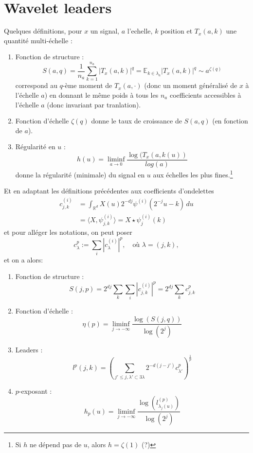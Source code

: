 \documentclass[11pt]{article} %
\begin{document}
\section{Wavelet leaders}
	Quelques définitions, pour $x$ un signal, $a$ l'echelle, $k$ position et $T_x(a,k)$ une quantité multi-échelle :
	\begin{enumerate}
		\item Fonction de structure :
			\begin{equation}
				S(a,q) = \frac{1}{n_a}\sum_{k=1}^{n_a} |T_x(a,k)|^q = \mathbb{E}_{k\in\lambda_a} |T_x(a,k)|^q \sim a^{\zeta(q)}
			\end{equation}
			correspond au $q$-ème moment de $T_x(a,\cdot)$ (donc un moment généralisé de $x$ à l'échelle $a$) en donnant le même poids à tous les $n_a$ coefficients accessibles à l'échelle $a$ (donc invariant par tranlation). 
		\item Fonction d'échelle $\zeta(q)$ donne le taux de croissance de $S(a,q)$ (en fonction de $a$).
		\item Régularité en $u$ :
			\begin{equation}
				h(u) = \liminf_{a\to 0} \frac{\log(T_x(a, k(u))}{log(a)}
			\end{equation}
			donne la régularité (minimale) du signal en $u$ aux échelles les plus fines.\footnote{Si $h$ ne dépend pas de $u$, alors $h = \zeta(1)$ (?)} 
	\end{enumerate}
	Et en adaptant les définitions précédentes aux coefficients d'ondelettes
	\begin{align}
		c_{j,k}^{(i)} 	&= \int_{\mathbb{R}^d} X(u)2^{-dj}\psi^{(i)}(2^{-j}u -k) \,du\\
					&= \langle X, \psi_{j,k}^{(i)} \rangle = X\star \psi_{j}^{(i)}(k)
	\end{align}
	et pour alléger les notations, on peut poser
	\begin{equation}
		c_{\lambda}^p := \sum_i |c_{\lambda}^{(i)}|^p,\quad\text{où $\lambda=(j,k) $},
	\end{equation}
	 et on a alors:
	\begin{enumerate}
		\item Fonction de structure :
			\begin{equation}
				S(j,p) = 2^{dj}\sum_k\sum_i |c_{j,k}^{(i)}|^p = 2^{dj}\sum_k c_{j,k}^p
			\end{equation}
		\item Fonction d'échelle :
			\begin{equation}
				\eta(p) = \liminf_{j\to-\infty} \frac{\log(S(j,q))}{\log(2^j)}
			\end{equation}
		\item Leaders :
			\begin{equation}
				l^p(j,k) = \left( \sum_{j'\leq j, \lambda'\subset 3\lambda} 2^{-d(j-j')} c_{\lambda'}^p \right)^{\frac{1}{p}}
			\end{equation}
		\item $p$-exposant :
			\begin{equation}
				h_p(u) = \liminf_{j\to -\infty} \frac{\log(l_{\lambda_j(u)}^{(p)})}{\log(2^j)}
			\end{equation}
	\end{enumerate}
\end{document}
